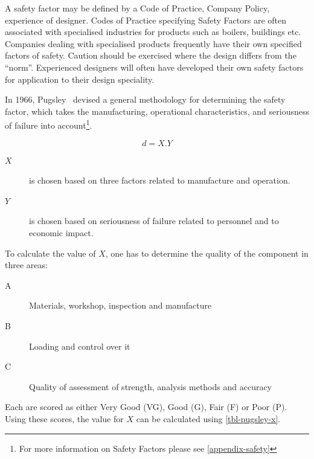 A safety factor may be defined by a Code of Practice, Company Policy, experience of designer. Codes of Practice specifying Safety Factors are often associated with specialised industries for products such as boilers, buildings etc. Companies dealing with specialised products frequently have their own specified factors of safety. Caution should be exercised where the design differs from the ``norm''. Experienced designers will often have developed their own safety factors for application to their design speciality.


In 1966, Pugsley~\cite{howard1967} devised a general methodology for determining the safety factor, which takes the manufacturing, operational characteristics, and seriousness of failure into account\footnote{For more information on Safety Factors please see \cref{appendix-safety}}.

\begin{equation}
    d = X.Y
\end{equation}

\begin{description}
    \item[\(X\)] is chosen based on three factors related to manufacture and operation.
    \item[\(Y\)] is chosen based on seriousness of failure related to personnel and to economic impact.
\end{description}

To calculate the value of \(X\), one has to determine the quality of the component in three areas:

\begin{description}
    \item[A] Materials, workshop, inspection and manufacture
    \item[B] Loading and control over it
    \item[C] Quality of assessment of strength, analysis methods and accuracy
\end{description}

Each are scored as either Very Good (VG), Good (G), Fair (F) or Poor (P). Using these scores, the value for \(X\) can be calculated using \cref{tbl-pugsley-x}.

